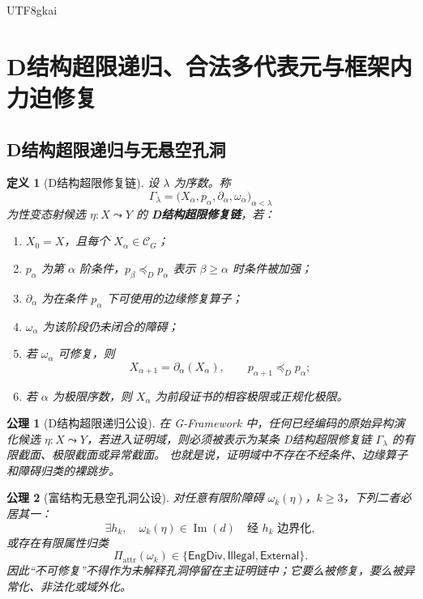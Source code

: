 \documentclass[12pt]{article}
\newtheorem{definition}{定义}[section]
\newtheorem{axiom}{公理}[section]
\newcommand{\Cat}{\mathcal{C}}
\newcommand{\GFramework}{\textsf{G-Framework}}
\newcommand{\Imop}{\operatorname{Im}}
\newcommand{\EngDiv}{\mathsf{EngDiv}}
\begin{document}
\begin{CJK*}{UTF8}{gkai}
\section{D结构超限递归、合法多代表元与框架内力迫修复}
\label{sec:tex50-d-transfinite-repair}

\subsection{D结构超限递归与无悬空孔洞}
\label{subsec:tex50-d-transfinite}

\begin{definition}[D结构超限修复链]
\label{def:tex50-d-transfinite-chain}
设 $\lambda$ 为序数。称
\[
  \Gamma_\lambda
  =
  \bigl(X_\alpha,p_\alpha,\partial_\alpha,\omega_\alpha\bigr)_{\alpha<\lambda}
\]
为性变态射候选 $\eta:X\leadsto Y$ 的 \textbf{D结构超限修复链}，若：
\begin{enumerate}
  \item $X_0=X$，且每个 $X_\alpha\in\Cat_G$；
  \item $p_\alpha$ 为第 $\alpha$ 阶条件，$p_{\beta}\preceq_D p_\alpha$ 表示 $\beta\ge\alpha$ 时条件被加强；
  \item $\partial_\alpha$ 为在条件 $p_\alpha$ 下可使用的边缘修复算子；
  \item $\omega_\alpha$ 为该阶段仍未闭合的障碍；
  \item 若 $\omega_\alpha$ 可修复，则
  \[
    X_{\alpha+1}=\partial_\alpha(X_\alpha),
    \qquad
    p_{\alpha+1}\preceq_D p_\alpha;
  \]
  \item 若 $\alpha$ 为极限序数，则 $X_\alpha$ 为前段证书的相容极限或正规化极限。
\end{enumerate}
\end{definition}

\begin{axiom}[D结构超限递归公设]
\label{ax:tex50-d-transfinite-recursion}
在 \GFramework{} 中，任何已经编码的原始异构演化候选 $\eta:X\leadsto Y$，若进入证明域，则必须被表示为某条 D结构超限修复链 $\Gamma_\lambda$ 的有限截面、极限截面或异常截面。
也就是说，证明域中不存在不经条件、边缘算子和障碍归类的裸跳步。
\end{axiom}

\begin{axiom}[富结构无悬空孔洞公设]
\label{ax:tex50-no-dangling-hole}
对任意有限阶障碍 $\omega_k(\eta)$，$k\ge3$，下列二者必居其一：
\[
  \exists h_k,\quad \omega_k(\eta)\in\Imop(d)
  \quad\text{经 }h_k\text{ 边界化},
\]
或存在有限属性归类
\[
  \Pi_{\mathrm{attr}}(\omega_k)
  \in\{\EngDiv,\mathsf{Illegal},\mathsf{External}\}.
\]
因此“不可修复”不得作为未解释孔洞停留在主证明链中；它要么被修复，要么被异常化、非法化或域外化。
\end{axiom}


\end{CJK*}
\end{document}
